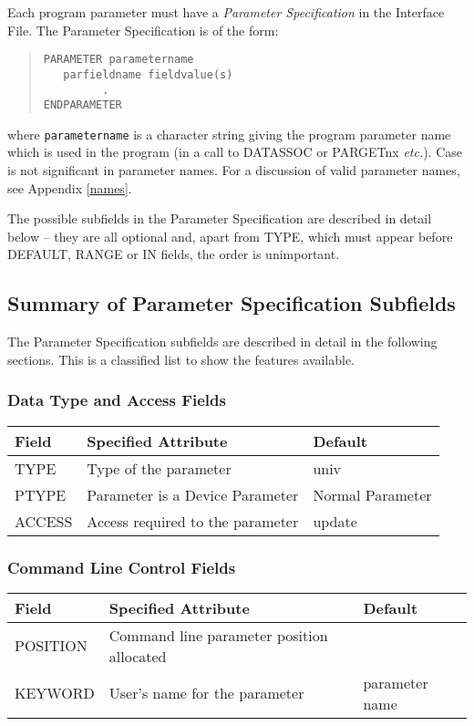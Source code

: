 \documentclass[twoside,11pt]{article}
\newcommand{\xlabel}[1]{}
\renewcommand{\_}{\texttt{\symbol{95}}}
\begin{document}
Each program parameter must have a {\em Parameter Specification} in the
Interface File. The Parameter Specification is of the form:
\begin{quote} \begin{verbatim}
PARAMETER parametername
   parfieldname fieldvalue(s)
         .
ENDPARAMETER
\end{verbatim} \end{quote}
where \texttt{parametername} is a character string giving the program parameter
name which is used in the program (in a call to DAT\_ASSOC or
PAR\_GETnx {\em etc.}). Case is not significant in parameter names.
For a discussion of valid parameter names, see Appendix \ref{names}.

The possible subfields in the Parameter Specification are described in detail
below -- they are all optional and, apart from
TYPE, which must appear before DEFAULT, RANGE or IN fields, the order
is unimportant.

\subsection{Summary of Parameter Specification Subfields
\xlabel{summary_of_parameter_specification_subfields}}

The Parameter Specification subfields are described in detail in the following
sections. This is a classified list to show the features available.

\subsubsection*{Data Type and Access Fields}
\begin{center}
\begin{tabular}{|l|l|l|} \hline
Field & Specified Attribute & Default\\
\hline
TYPE & Type of the parameter & univ \\
PTYPE & Parameter is a Device Parameter & Normal Parameter \\
ACCESS & Access required to the parameter & update \\
\hline
\end{tabular}
\end{center}

\subsubsection*{Command Line Control Fields}
\begin{center}
\begin{tabular}{|l|l|l|} \hline
Field & Specified Attribute & Default\\
\hline
POSITION & Command line parameter position allocated & \\
KEYWORD & User's name for the parameter & parameter
name \\
\hline
\end{tabular}
\end{center}
\end{document}

